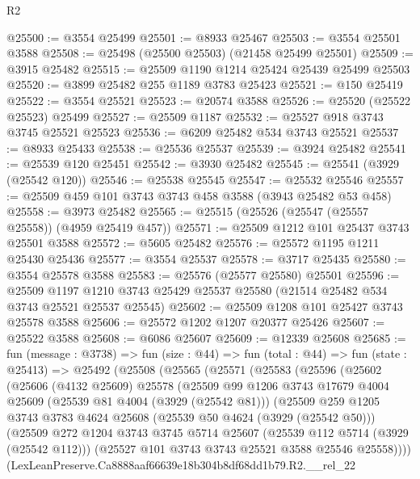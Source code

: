 \begin{lexlean}{R2}
\begin{coremodule}
@25500 := @3554 @25499
@25501 := @8933 @25467
@25503 := @3554 @25501 @3588
@25508 := @25498 (@25500 @25503) (@21458 @25499 @25501)
@25509 := @3915 @25482
@25515 := @25509 @1190 @1214 @25424 @25439 @25499 @25503
@25520 := @3899 @25482 @255 @1189 @3783 @25423
@25521 := @150 @25419
@25522 := @3554 @25521
@25523 := @20574 @3588
@25526 := @25520 (@25522 @25523) @25499
@25527 := @25509 @1187
@25532 := @25527 @918 @3743 @3745 @25521 @25523
@25536 := @6209 @25482 @534 @3743 @25521
@25537 := @8933 @25433
@25538 := @25536 @25537
@25539 := @3924 @25482
@25541 := @25539 @120 @25451
@25542 := @3930 @25482
@25545 := @25541 (@3929 (@25542 @120))
@25546 := @25538 @25545
@25547 := @25532 @25546
@25557 := @25509 @459 @101 @3743 @3743 @458 @3588 (@3943 @25482 @53 @458)
@25558 := @3973 @25482
@25565 := @25515 (@25526 (@25547 (@25557 @25558)) (@4959 @25419 @457))
@25571 := @25509 @1212 @101 @25437 @3743 @25501 @3588
@25572 := @5605 @25482
@25576 := @25572 @1195 @1211 @25430 @25436
@25577 := @3554 @25537
@25578 := @3717 @25435
@25580 := @3554 @25578 @3588
@25583 := @25576 (@25577 @25580) @25501
@25596 := @25509
    @1197
    @1210
    @3743
    @25429
    @25537
    @25580
    (@21514 @25482 @534 @3743 @25521 @25537 @25545)
@25602 := @25509 @1208 @101 @25427 @3743 @25578 @3588
@25606 := @25572 @1202 @1207 @20377 @25426
@25607 := @25522 @3588
@25608 := @6086 @25607
@25609 := @12339 @25608
@25685 := fun (message : @3738) =>
  fun (size : @44) =>
  fun (total : @44) =>
  fun (state : @25413) =>
  @25492
    (@25508
      (@25565
        (@25571
          (@25583
            (@25596
              (@25602
                (@25606
                  (@4132 @25609)
                  @25578
                  (@25509
                    @99
                    @1206
                    @3743
                    @17679
                    @4004
                    @25609
                    (@25539 @81 @4004 (@3929 (@25542 @81)))
                    (@25509
                      @259
                      @1205
                      @3743
                      @3783
                      @4624
                      @25608
                      (@25539 @50 @4624 (@3929 (@25542 @50)))
                      (@25509
                        @272
                        @1204
                        @3743
                        @3745
                        @5714
                        @25607
                        (@25539 @112 @5714 (@3929 (@25542 @112)))
                        (@25527 @101 @3743 @3743 @25521 @3588 @25546 @25558))))
                  (LexLeanPreserve.Ca8888aaf66639e18b304b8df68dd1b79.R2.__rel_22

\end{coremodule}
\end{lexlean}

